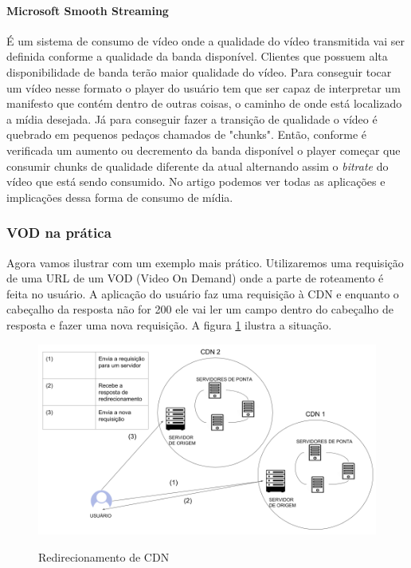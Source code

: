 \paragraph{Microsoft Smooth Streaming} \'E um sistema de consumo de v\'ideo onde a qualidade do v\'ideo transmitida vai ser definida conforme a qualidade da banda dispon\'ivel. Clientes que possuem alta disponibilidade de banda ter\~ao maior qualidade do v\'ideo. 
 Para conseguir tocar um v\'ideo nesse formato o player do usu\'ario tem que ser capaz de interpretar um manifesto que cont\'em dentro de outras coisas, o caminho de onde est\'a localizado a m\'idia desejada. 
 J\'a para conseguir fazer a transi\c{c}\~ao de qualidade o v\'ideo \'e quebrado em pequenos peda\c{c}os chamados de "chunks". Ent\~ao, conforme \'e verificada um aumento ou decremento da banda dispon\'ivel o player come\c{c}ar que consumir chunks de qualidade diferente da atual alternando assim o \textit{bitrate} do v\'ideo que est\'a sendo consumido. 
 No artigo \cite{zambelli2009iis} podemos ver todas as aplica\c{c}\~oes e implica\c{c}\~oes dessa forma de consumo de m\'idia.
\subsubsection{VOD na pr\'atica}
\label{subsubsection:vod_exemplo}
Agora vamos ilustrar com um exemplo mais pr\'atico. Utilizaremos uma requisi\c{c}\~ao de uma URL de um VOD (Video On Demand) onde a parte de roteamento \'e feita no usu\'ario. A aplica\c{c}\~ao do usu\'ario faz uma requisi\c{c}\~ao \`a CDN e enquanto o cabe\c{c}alho da resposta n\~ao for 200 ele vai ler um campo dentro do cabe\c{c}alho de resposta e fazer uma nova requisi\c{c}\~ao. A figura  \ref{figura:vod_redirect_exemple} ilustra a situa\c{c}\~ao.

\begin{figure}[H]
\caption{Redirecionamento de CDN}
\includegraphics[width=15cm]{Figuras/vod_redirect_exemple.png} 
\label{figura:vod_redirect_exemple}
\end{figure}